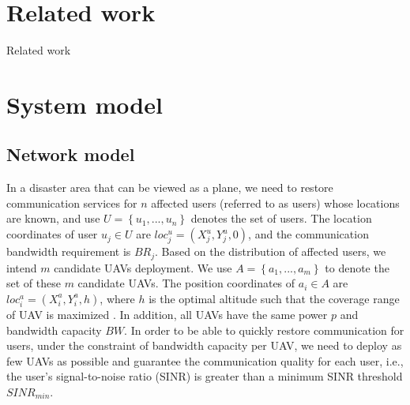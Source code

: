 \documentclass[journal]{IEEEtran}
\begin{document}
\section{Related work}
Related work
\section{System model}
\subsection{Network model}
In a disaster area that can be viewed as a plane, we need to restore communication services for $n$ affected users (referred to as users) whose locations are known, and use $U=\left\{u_1,... ,u_n\right\}$ denotes the set of users. The location coordinates of user $u_j\in U$ are $loc^u_j=(X^u_j,Y^u_j,0)$, and the communication bandwidth requirement is $BR_j$. Based on the distribution of affected users, we intend $m$ candidate UAVs deployment. We use $A=\left\{a_1,... ,a_m\right\}$ to denote the set of these $m$ candidate UAVs. The position coordinates of $a_i\in A$ are $loc^a_i=(X^a_i,Y^a_i,h)$, where $h$ is the optimal altitude such that the coverage range of UAV is maximized \cite{al-hourani_optimal_2014}. In addition, all UAVs have the same power $p$ and bandwidth capacity $BW$. In order to be able to quickly restore communication for users, under the constraint of bandwidth capacity per UAV, we need to deploy as few UAVs as possible and guarantee the communication quality for each user, i.e., the user's signal-to-noise ratio (SINR) is greater than a minimum SINR threshold $SINR_{min}$.
\end{document}
